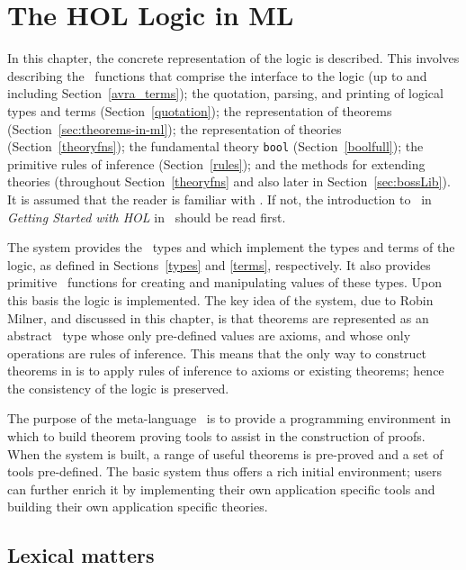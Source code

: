 \chapter{The HOL Logic in ML}\label{HOLsyschapter}

In this chapter, the concrete representation of the \HOL{} logic is
described.  This involves describing the \ML\ functions that comprise
the interface to the logic (up to and including
Section~\ref{avra_terms}); the quotation, parsing, and printing of
logical types and terms (Section~\ref{quotation}); the representation of
theorems (Section~\ref{sec:theorems-in-ml}); the representation of theories
(Section~\ref{theoryfns}); the fundamental \HOL{} theory \texttt{bool}
(Section~\ref{boolfull}); the primitive rules of inference
(Section~\ref{rules}); and the methods for extending theories
(throughout Section~\ref{theoryfns} and also later in
Section~\ref{sec:bossLib}).  It is assumed that the reader is familiar
with \ML.  If not, the introduction to \ML\ in {\sl Getting Started
with HOL\/} in \TUTORIAL\ should be read first.

The \HOL{} system provides the \ML\ types  and 
which implement the types and terms of the \HOL{} logic, as defined in
Sections~\ref{types} and \ref{terms}, respectively. It also provides
primitive \ML\ functions for creating and manipulating values of these
types. Upon this basis the \HOL{} logic is implemented. The key idea
of the \HOL{} system, due to Robin Milner, and
discussed in this chapter, is that theorems are represented as an
abstract \ML\ type whose only pre-defined values are axioms, and whose
only operations are rules of inference. This means that the only way
to construct theorems in \HOL{} is to apply rules of inference to
axioms or existing theorems; hence the consistency of the logic is
preserved.

The purpose of the meta-language \ML\ is to provide a programming
environment in which to build theorem proving tools to assist in the
construction of proofs.  When the \HOL{} system is built, a range of
useful theorems is pre-proved and a set of tools pre-defined. The basic
system thus offers a rich initial environment; users can further enrich
it by implementing their own application specific tools and building
their own application specific theories.


\section{Lexical matters}\label{HOL-lex}

